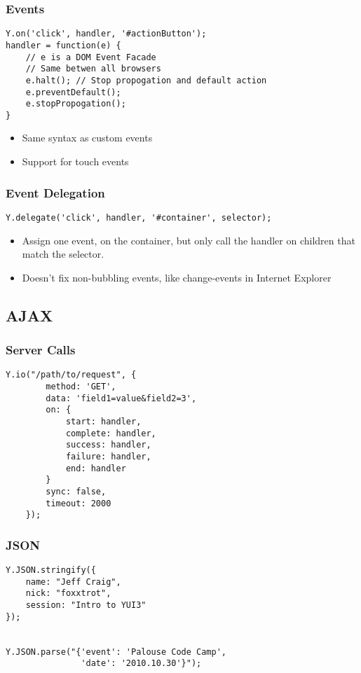 \documentclass[t]{beamer}
\begin{document}
\begin{frame}[fragile]
 \frametitle{Events}
 \begin{verbatim}
Y.on('click', handler, '#actionButton');
handler = function(e) {
    // e is a DOM Event Facade
    // Same betwen all browsers
    e.halt(); // Stop propogation and default action
    e.preventDefault();
    e.stopPropogation();
}
 \end{verbatim}
 \begin{itemize}
  \item Same syntax as custom events
  \item Support for touch events
 \end{itemize}
\end{frame}

\begin{frame}[fragile]
 \frametitle{Event Delegation}
 \begin{verbatim}
Y.delegate('click', handler, '#container', selector);
 \end{verbatim}
 \begin{itemize}
  \item Assign one event, on the container, but only call the handler on children that match the selector.
  \item<2-> Doesn't fix non-bubbling events, like change-events in Internet Explorer 
 \end{itemize}
\end{frame}

\subsection{AJAX}
\begin{frame}[fragile]
 \frametitle{Server Calls}
 \begin{verbatim}
Y.io("/path/to/request", {
        method: 'GET',
        data: 'field1=value&field2=3',
        on: {
            start: handler,
            complete: handler,
            success: handler,
            failure: handler,
            end: handler
        }
        sync: false,
        timeout: 2000
    });
 \end{verbatim}
\end{frame}

\begin{frame}[fragile]
 \frametitle{JSON}
\begin{verbatim}
Y.JSON.stringify({
    name: "Jeff Craig",
    nick: "foxxtrot",
    session: "Intro to YUI3"
});


Y.JSON.parse("{'event': 'Palouse Code Camp', 
               'date': '2010.10.30'}");

\end{verbatim}
\end{frame}
\end{document}

